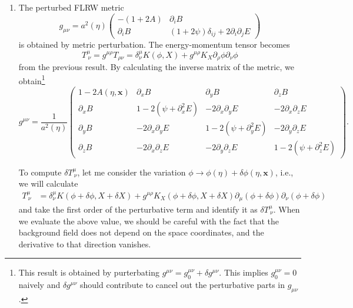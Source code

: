\documentclass[a4paper,pdftex,10pt]{article}
\begin{document}
\begin{enumerate}
  \item
        The perturbed FLRW metric
        \begin{equation}
          g_{\mu\nu}
          =
          a^2(\eta)
          \begin{pmatrix}
            -(1+2A)       & \partial_{i}B                                   \\
            \partial_{i}B & (1+2\psi)\delta_{ij}+2\partial_{i}\partial_{j}E
          \end{pmatrix}
        \end{equation}
        is obtained by metric perturbation. The energy-momentum tensor becomes
        \begin{equation}
          T^{\mu}_{\ \nu}
          =
          g^{\mu\rho}T_{\rho\nu}
          =
          \delta^{\mu}_{\nu}K(\phi,X)
          +
          g^{\mu\rho}
          K_{X}
          \partial_{\rho}\phi\partial_{\nu}\phi
          \label{eqn:upperd_energy-momentum_tensor}
        \end{equation}
        from the previous result. By calculating the inverse matrix of the metric, we obtain\footnote{
        This result is obtained by purterbating $g^{\mu\nu}=g_{0}^{\mu\nu}+\delta g^{\mu\nu}$. This implies $g_{0}^{\mu\nu}=0$ naively and $\delta g^{\mu\nu}$ should contribute to cancel out the perturbative parts in $g_{\mu\nu}$.
        }
        \begin{equation}
          g^{\mu\nu}
          =
          \frac{1}{a^2(\eta)}
          \begin{pmatrix}
            1-2A(\eta,\bm{x}) & \partial_{x}B               & \partial_{y}B               & \partial_{z}B                \\
            \partial_{x}B     & 1-2(\psi+\partial_{x}^{2}E) & -2\partial_{x}\partial_{y}E & -2\partial_{x}\partial_{z}E  \\
            \partial_{y}B     & -2\partial_{x}\partial_{y}E & 1-2(\psi+\partial_{y}^{2}E) & -2\partial_{y}\partial_{z} E \\
            \partial_{z}B     & -2\partial_{x}\partial_{z}E & -2\partial_{y}\partial_{z}E & 1-2(\psi+\partial_{z}^{2}E)
          \end{pmatrix}
          .
        \end{equation}

        To compute $\delta T^{\mu}_{\ \nu}$, let me consider the variation $\phi\rightarrow\phi(\eta)+\delta\phi(\eta,\bm{x})$, i.e., we will calculate
        \begin{align}
          T^{\mu}_{\ \nu}
           & =
          \delta^{\mu}_{\nu}
          K(\phi+\delta\phi, X+\delta X)
          +
          g^{\mu\rho}
          K_{X}(\phi+\delta\phi, X+\delta X)
          \partial_{\mu}(\phi+\delta\phi)
          \partial_{\nu}(\phi+\delta\phi)
          \label{eqn:T_def}
        \end{align}
        and take the first order of the perturbative term and identify it as $\delta T^{\mu}_{\ \nu}$. When we evaluate the above value, we should be careful with the fact that the background field does not depend on the space coordinates, and the derivative to that direction vanishes.


\end{enumerate}
\end{document}
